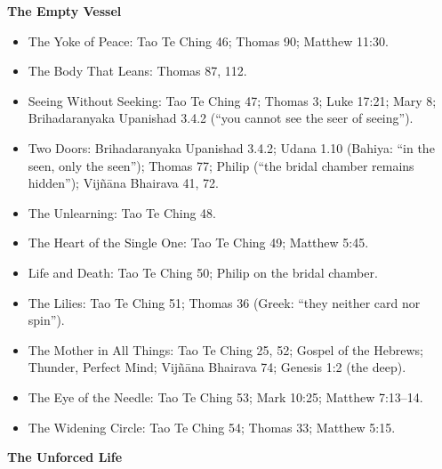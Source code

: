 \documentclass[10pt, openright]{book}
\providecommand{\tightlist}{\setlength{\itemsep}{0pt}\setlength{\parskip}{0pt}}
\begin{document}
\textbf{The Empty Vessel}

\begin{itemize}
\tightlist
\item
  The Yoke of Peace: Tao Te Ching 46; Thomas 90; Matthew 11:30.
\item
  The Body That Leans: Thomas 87, 112.
\item
  Seeing Without Seeking: Tao Te Ching 47; Thomas 3; Luke 17:21; Mary 8;
  Brihadaranyaka Upanishad 3.4.2 (``you cannot see the seer of
  seeing'').
\item
  Two Doors: Brihadaranyaka Upanishad 3.4.2; Udana 1.10 (Bahiya: ``in
  the seen, only the seen''); Thomas 77; Philip (``the bridal chamber
  remains hidden''); Vijñāna Bhairava 41, 72.
\item
  The Unlearning: Tao Te Ching 48.
\item
  The Heart of the Single One: Tao Te Ching 49; Matthew 5:45.
\item
  Life and Death: Tao Te Ching 50; Philip on the bridal chamber.
\item
  The Lilies: Tao Te Ching 51; Thomas 36 (Greek: ``they neither card nor
  spin'').
\item
  The Mother in All Things: Tao Te Ching 25, 52; Gospel of the Hebrews;
  Thunder, Perfect Mind; Vijñāna Bhairava 74; Genesis 1:2 (the deep).
\item
  The Eye of the Needle: Tao Te Ching 53; Mark 10:25; Matthew 7:13--14.
\item
  The Widening Circle: Tao Te Ching 54; Thomas 33; Matthew 5:15.
\end{itemize}

\textbf{The Unforced Life}
\end{document}

